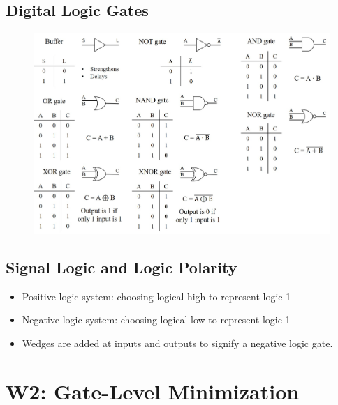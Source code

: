 \documentclass[a4paper]{article}
\begin{document}
\subsection{Digital Logic Gates}
\begin{figure}[H]
    \centering
    \includegraphics[width=\textwidth]{logicgates.jpg}
\end{figure}

\subsection{Signal Logic and Logic Polarity}
\begin{itemize}
    \item Positive logic system: choosing logical high to represent logic 1
    \item Negative logic system: choosing logical low to represent logic 1
    \item Wedges are added at inputs and outputs to signify a negative logic gate.
\end{itemize}
\newpage
\section{W2: Gate-Level Minimization}
\end{document}
